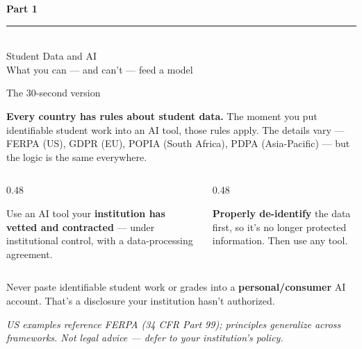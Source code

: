 \documentclass[aspectratio=169, 10pt]{beamer}
\newcommand{\cmcite}[1]{{\scriptsize\color{CoolGray}\textit{#1}}}
\begin{document}
{
\begin{frame}
\centering\vfill
{\fontsize{22}{28}\bfseries\selectfont\color{white} Part 1}\\[6pt]
{\color{UVMGold}\rule{5cm}{0.8pt}}\\[6pt]
{\normalsize\color{UVMGold} Student Data and AI}\\[4pt]
{\small\color{PaleSage} What you can --- and can't --- feed a model}
\vfill
\end{frame}
}

\begin{frame}{The 30-second version}
\vskip-4pt
\begin{tcolorbox}[accentbox, top=1pt, bottom=1pt]
\footnotesize
\textbf{Every country has rules about student data.} The moment you put identifiable student work into an AI tool, those rules apply. The details vary --- FERPA (US), GDPR (EU), POPIA (South Africa), PDPA (Asia-Pacific) --- but the logic is the same everywhere.
\end{tcolorbox}
\vskip1pt
\begin{columns}[T]
\begin{column}{0.48\textwidth}
\begin{tcolorbox}[dobox, title={\faCheck\quad Path 1: Approved tool}, top=1pt, bottom=1pt]
\footnotesize Use an AI tool your \textbf{institution has vetted and contracted} --- under institutional control, with a data-processing agreement.
\end{tcolorbox}
\end{column}
\begin{column}{0.48\textwidth}
\begin{tcolorbox}[dobox, title={\faCheck\quad Path 2: De-identify}, top=1pt, bottom=1pt]
\footnotesize \textbf{Properly de-identify} the data first, so it's no longer protected information. Then use any tool.
\end{tcolorbox}
\end{column}
\end{columns}
\vskip2pt
\begin{tcolorbox}[dontbox, title={\faBan\quad The universal don't}, top=1pt, bottom=1pt]
\footnotesize Never paste identifiable student work or grades into a \textbf{personal/consumer} AI account. That's a disclosure your institution hasn't authorized.
\end{tcolorbox}
\vskip1pt
\cmcite{US examples reference FERPA (34 CFR Part 99); principles generalize across frameworks. Not legal advice --- defer to your institution's policy.}
\end{frame}
\end{document}
